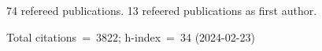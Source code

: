 74 refereed publications. 13 refeered publications as first author.

Total citations~=~3822; h-index~=~34 (2024-02-23)